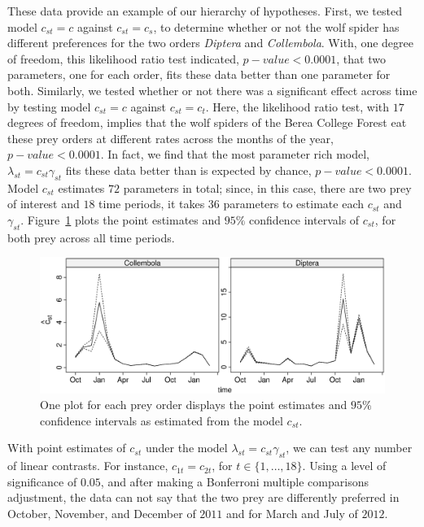 These data provide an example of our hierarchy of hypotheses.  First, we tested model $c_{st} = c$ against $c_{st} = c_s$, to determine whether or not the wolf spider has different preferences for the two orders \textit{Diptera}  and \textit{Collembola}.  With, one degree of freedom, this likelihood ratio test indicated, $p-value < 0.0001$,  that two parameters, one for each order, fits these data better than one parameter for both.  Similarly, we tested whether or not there was a significant effect across time by testing model $c_{st} = c$ against $c_{st} = c_t$.  Here, the likelihood ratio test, with $17$ degrees of freedom, implies that the wolf spiders of the Berea College Forest eat these prey orders at different rates across the months of the year, $p-value < 0.0001$.  In fact, we find that the most parameter rich model, $\lambda_{st} = c_{st} \gamma_{st}$ fits these data better than is expected by chance, $p-value < 0.0001$.  Model $c_{st}$ estimates $72$ parameters in total; since, in this case, there are two prey of interest and $18$ time periods, it takes $36$ parameters to estimate each $c_{st}$ and $\gamma_{st}$.  Figure~\ref{fig:cst} plots the point estimates and $95\%$ confidence intervals of $c_{st}$, for both prey across all time periods.  

\begin{figure}
  \centering
  \includegraphics[scale=0.5]{cst}
  \caption{One plot for each prey order displays the point estimates and $95\%$ confidence intervals as estimated from the model $c_{st}$.}
  \label{fig:cst}
\end{figure}

With point estimates of $c_{st}$ under the model $\lambda_{st} = c_{st} \gamma_{st}$, we can test any number of linear contrasts.  For instance, $c_{1t} = c_{2t}$, for $t \in \{1, \ldots, 18\}$.  Using a level of significance of $0.05$, and after making a Bonferroni multiple comparisons adjustment, the data can not say that the two prey are differently preferred in October, November, and December of $2011$ and for March and July of $2012$.  


